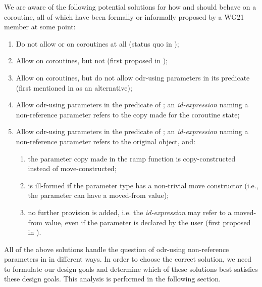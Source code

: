 We are aware of the following potential solutions for how  and  should behave on a coroutine, all of which have been formally or informally proposed by a WG21 member at some point:
\begin{enumerate}
\item Do not allow  or  on coroutines at all (status quo in \cite{P2900R8});
\item Allow  on coroutines, but not  (first proposed in \cite{P2957R1});
\item Allow  on coroutines, but do not allow odr-using parameters in its predicate (first mentioned in \cite{P2957R1} as an alternative);
\item Allow odr-using parameters in the predicate of ; an \emph{id-expression} naming a non-reference parameter refers to the copy made for the coroutine state;
\item Allow odr-using parameters in the predicate of ; an \emph{id-expression} naming a non-reference parameter refers to the original object, and:
\begin{enumerate}[label=\alph*.,ref=\theenumi\alph*]
        \item the parameter copy made in the ramp function is copy-constructed instead of move-constructed;
        \item is ill-formed if the parameter type has a non-trivial move constructor (i.e., the parameter can have a moved-from value);
        \item no further provision is added, i.e. the \emph{id-expression} may refer to a moved-from value, even if the parameter is declared  by the user (first proposed in \cite{P2957R0}).
\end{enumerate}
\end{enumerate}
All of the above solutions handle the question of odr-using non-reference parameters in  in different ways. In order to choose the correct solution, we need to formulate our design goals and determine which of these solutions best satisfies these design goals. This analysis is performed in the following section.


